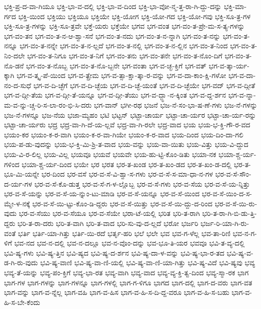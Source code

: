 {ಭಕ್ತಿ-ಪ್ರ-ದ-ವಾ-ಗಿಯೂ
ಭಕ್ತಿ-ಭಾ-ವ-ದಲ್ಲಿ
ಭಕ್ತಿ-ಭಾ-ವ-ದಿಂದ
ಭಕ್ತಿ-ಭಾ-ವೋ-ನ್ಮ-ತ್ತ-ರಾ-ಗಿ-ದ್ದು-ದನ್ನು
ಭಕ್ತಿ-ಮಾ-ರ್ಗದ
ಭಕ್ತಿ-ಯಿಂದ
ಭಕ್ತಿಯು
ಭಕ್ತಿಯೂ
ಭಕ್ತಿಯೇ
ಭಕ್ತಿ-ಯೋಗ
ಭಕ್ತಿ-ಯೋ-ಗದ
ಭಕ್ತಿ-ಯೋ-ಗವು
ಭಕ್ತಿ-ಸೂ-ತ್ರ-ಗಳ
ಭಕ್ತಿ-ಸೂ-ತ್ರ-ಗಳನ್ನು
ಭಕ್ತಿ-ಸೂ-ತ್ರವೇ
ಭಕ್ತೆ-ಯರು
ಭಕ್ತೆಯೇ
ಭಗವ
ಭಗ-ವಂತ
ಭಗ-ವಂ-ತ-ಪ್ರೇ-ಮ-ಸ-ತ್ಯ-ಗಳನ್ನು
ಭಗ-ವಂ-ತನ
ಭಗ-ವಂ-ತ-ನ-ಆ-ಶ್ವಾ-ಸನೆ
ಭಗ-ವಂ-ತ-ನದು
ಭಗ-ವಂ-ತ-ನ-ನ್ನಾಗಿ
ಭಗ-ವಂ-ತ-ನನ್ನು
ಭಗ-ವಂ-ತ-ನನ್ನೂ
ಭಗ-ವಂ-ತ-ನನ್ನೇ
ಭಗ-ವಂ-ತ-ನ-ಲ್ಲದೆ
ಭಗ-ವಂ-ತ-ನಲ್ಲಿ
ಭಗ-ವಂ-ತ-ನ-ಲ್ಲಿನ
ಭಗ-ವಂ-ತ-ನಿಂದ
ಭಗ-ವಂ-ತ-ನಿಂ-ದಲೇ
ಭಗ-ವಂ-ತ-ನಿಗೂ
ಭಗ-ವಂ-ತ-ನಿಗೆ
ಭಗ-ವಂ-ತನು
ಭಗ-ವಂ-ತನೇ
ಭಗ-ವಂ-ತ-ನೊಂ-ದಿಗೆ
ಭಗ-ವಂ-ತ-ನೊ-ಡನೆ
ಭಗ-ವಂ-ತ-ನೊಬ್ಬ
ಭಗ-ವಂ-ತ-ನೊ-ಬ್ಬನೇ
ಭಗ-ವಂತಾ
ಭಗ-ವ-ಚ್ಛ-ಕ್ತಿಗೆ
ಭಗ-ವತ್
ಭಗ-ವ-ತ್ಕಾ-ರ್ಯ-ಕ್ಕಾಗಿ
ಭಗ-ವ-ತ್ಕೃ-ಪೆ-ಯಿಂದ
ಭಗ-ವ-ತ್ಪ್ರೇಮ
ಭಗ-ವ-ತ್ಸಾ-ಕ್ಷಾ-ತ್ಕಾ-ರ-ವನ್ನು
ಭಗ-ವ-ದಾ-ಕಾಂ-ಕ್ಷಿ-ಗಳೋ
ಭಗ-ವ-ದಾ-ನಂ-ದ-ಸುಧೆ
ಭಗ-ವ-ದಿ-ಚ್ಛೆಗೆ
ಭಗ-ವ-ದಿ-ಚ್ಛೆಯ
ಭಗ-ವ-ದಿ-ಚ್ಛೆ-ಯಂತೆ
ಭಗ-ವ-ದಿ-ಚ್ಛೆಯೇ
ಭಗ-ವದ್
ಭಗ-ವ-ದ್ಗೀತೆ
ಭಗ-ವ-ದ್ಗೀ-ತೆಯ
ಭಗ-ವ-ದ್ಗೀ-ತೆ-ಯನ್ನೂ
ಭಗ-ವ-ದ್ಗೀ-ತೆಯು
ಭಗ-ವ-ದ್ಜ್ಞಾ-ನ-ಕ್ಕಿಂತ
ಭಗ-ವ-ದ್ದ-ರ್ಶನ
ಭಗ-ವ-ನ್ನಾ-ಮ-ವ-ನ್ನು-ಚ್ಚ-ರಿ-ಸ-ಲಾ-ರಂ-ಭಿ-ಸಿ-ದರು
ಭಗ-ವಾನ್
ಭಗೀ-ರಥ
ಭಜನೆ
ಭಜ-ನೆ-ಸಂ-ಭಾ-ಷ-ಣೆ-ಗಳು
ಭಜ-ನೆ-ಗಳನ್ನು
ಭಜ-ನೆ-ಗಳನ್ನೂ
ಭಜ-ನೆಯ
ಭಜಾ-ಮ್ಯಹಂ
ಭಟಿ
ಭಟ್ಟನ್
ಭಟ್ಟಾ-ಚಾರ್ಯ
ಭಟ್ಟಾ-ಚಾ-ರ್ಯರ
ಭಟ್ಟಾ-ಚಾ-ರ್ಯ-ರನ್ನು
ಭಟ್ಟಾ-ಚಾ-ರ್ಯರು
ಭದ್ರ
ಭದ್ರ-ವಾ-ಗಿ-ದೆ-ಯ-ಲ್ಲವೆ
ಭದ್ರ-ವಾ-ಗಿ-ರಲೇ
ಭದ್ರ-ವಾದ
ಭಯ
ಭಯ-ಭ-ಕ್ತಿ-ಗೌ-ರ-ವದ
ಭಯಂ-ಕರ
ಭಯಂ-ಕ-ರ-ವಾಗಿ
ಭಯಂ-ಕ-ರ-ವಾ-ಗಿಯೇ
ಭಯಂ-ಕ-ರ-ವಾದ
ಭಯ-ದಿಂದ
ಭಯ-ದಿಂ-ದಾ-ಗಲಿ
ಭಯ-ಪ-ಡು-ವುದನ್ನು
ಭಯ-ಭ-ಕ್ತಿ-ಮಿ-ಶ್ರಿ-ತ-ವಾದ
ಭಯ-ವನ್ನು
ಭಯ-ವಾ-ಯಿತು
ಭಯ-ವಿತ್ತು
ಭಯ-ವಿ-ದ್ದುದ
ಭಯ-ವಿ-ರ-ಲಿಲ್ಲ
ಭಯ-ವಿಲ್ಲ
ಭಯವೂ
ಭಯವೆ
ಭಯವೇ
ಭಯ-ಹು-ಟ್ಟಿ-ಕೊಂ-ಡಿತು
ಭಯಾ-ನಕ
ಭಯಾ-ಶ್ಚ-ರ್ಯ-ಗಳಿಂದ
ಭಯಾ-ಶ್ಚ-ರ್ಯ-ದಿಂದ
ಭಯೇ
ಭರ
ಭರತ
ಭರ-ತ-ಖಂಡ
ಭರ-ತ-ಖಂ-ಡದ
ಭರ-ತ-ಖಂ-ಡ-ದಲ್ಲಿ
ಭರ-ತ-ಭೂ-ಮಿ-ಯನ್ನೇ
ಭರ-ದಿಂದ
ಭರ-ವಸೆ
ಭರ-ವ-ಸೆ-ವಿ-ಶ್ವಾ-ಸ-ಗಳು
ಭರ-ವ-ಸೆ-ಸ-ಮಾ-ಧಾ-ನ-ಗಳ
ಭರ-ವ-ಸೆ-ಸೌಂ-ದ-ರ್ಯ-ಗಳ
ಭರ-ವ-ಸೆ-ಕೊ-ಡುತ್ತ
ಭರ-ವ-ಸೆ-ಗ-ಳ-ಲ್ಲೊಬ್ಬ
ಭರ-ವ-ಸೆ-ಗಳು
ಭರ-ವ-ಸೆಯ
ಭರ-ವ-ಸೆ-ಯ-ನ್ನಿತ್ತು
ಭರ-ವ-ಸೆ-ಯನ್ನು
ಭರ-ವ-ಸೆ-ಯ-ನ್ನುಂ-ಟು-ಮಾಡಿ
ಭರ-ವ-ಸೆ-ಯನ್ನೂ
ಭರ-ವ-ಸೆ-ಯಿಂದ
ಭರ-ವ-ಸೆ-ಯಿಂ-ದ-ಸ-ಮ್ಮೇ-ಳ-ನಕ್ಕೆ
ಭರ-ವ-ಸೆ-ಯಿ-ಟ್ಟು-ಕೊಂ-ಡಿ-ದ್ದರು
ಭರ-ವ-ಸೆ-ಯಿತ್ತು
ಭರ-ವ-ಸೆ-ಯಿ-ದ್ದು-ದ-ರಿಂದ
ಭರ-ವ-ಸೆ-ಯಿ-ರು-ವುದು
ಭರ-ವ-ಸೆಯು
ಭರ-ವ-ಸೆಯೂ
ಭರ-ವ-ಸೆಯೇ
ಭರಾ-ಟೆ-ಯಲ್ಲಿ
ಭರಿತ
ಭರಿ-ತ-ರಾಗಿ
ಭರಿ-ತ-ರಾ-ಗಿ-ಬಿ-ಡು-ತ್ತಿ-ದ್ದರು
ಭರಿ-ತ-ರಾ-ದರು
ಭರಿ-ತ-ವಾಗಿ
ಭರಿ-ತ-ವಾದ
ಭರಿ-ಸು-ವು-ದ-ಲ್ಲದೆ
ಭರೋ
ಭರ್ಜರಿ
ಭರ್ಜ-ರಿ-ಯಾ-ಗಿ-ರು-ವಂತೆ
ಭರ್ತಿ
ಭರ್ತಿ-ಯಾ-ಗಿತ್ತು
ಭರ್ತಿ-ಯಿ-ರದೆ
ಭರ್ತೃ-ಹರಿ
ಭಲೆ
ಭಲೇ
ಭವ
ಭವ-ಗ-ಳೆಲ್ಲ
ಭವ-ತಾ-ರಿಣಿ
ಭವ-ನ-ಗ-ಳಿಗೆ
ಭವ-ನದ
ಭವ-ನ-ದಲ್ಲಿ
ಭವ-ನ-ದಲ್ಲೂ
ಭವ-ನ-ವೊಂ-ದನ್ನು
ಭವ-ಭೂ-ತಿ-ಯರ
ಭವವೂ
ಭವಿ-ತ-ವ್ಯ-ದಲ್ಲಿ
ಭವಿ-ಷ್ಯ-ಗಳು
ಭವಿ-ಷ್ಯ-ತ್ತಿನ
ಭವಿ-ಷ್ಯದ
ಭವಿ-ಷ್ಯ-ದ-ರ್ಶನ
ಭವಿ-ಷ್ಯ-ದಾ-ಳ-ವನ್ನು
ಭವಿ-ಷ್ಯ-ಭಾ-ರ-ತದ
ಭವಿ-ಷ್ಯ-ವ-ಡ-ಗಿ-ರು-ವುದು
ಭವಿ-ಷ್ಯ-ವಾಣಿ
ಭವಿ-ಷ್ಯ-ವಾ-ಣಿ-ಯಲ್ಲಿ
ಭವಿ-ಷ್ಯ-ವಾ-ಣಿ-ಯಾ-ಗಿತ್ತು
ಭವಿ-ಷ್ಯ-ವಿದೆ
ಭವಿ-ಷ್ಯವು
ಭವ್ಯ
ಭವ್ಯ-ತೆ-ಯನ್ನು
ಭವ್ಯ-ಪಂ-ಕ್ತಿಗೆ
ಭವ್ಯ-ಭಾ-ರತ
ಭವ್ಯ-ವಾಗಿ
ಭವ್ಯ-ವಾದ
ಭವ್ಯ-ವ್ಯ-ಕ್ತಿ-ತ್ವ-ದಿಂದ
ಭವ್ಯ-ಸ್ಮಾ-ರಕ
ಭಾಗ
ಭಾಗ-ಗಳ
ಭಾಗ-ಗಳನ್ನು
ಭಾಗ-ಗಳನ್ನೂ
ಭಾಗ-ಗಳಲ್ಲಿ
ಭಾಗ-ಗ-ಳಿಗೂ
ಭಾಗದ
ಭಾಗ-ದಲ್ಲಿ
ಭಾಗ-ದ-ವರು
ಭಾಗ-ವತ
ಭಾಗ-ವನ್ನು
ಭಾಗ-ವ-ನ್ನೆಲ್ಲ
ಭಾಗ-ವಹಿ
ಭಾಗ-ವ-ಹಿಸ
ಭಾಗ-ವ-ಹಿ-ಸ-ದಿ-ದ್ದ-ವರೂ
ಭಾಗ-ವ-ಹಿ-ಸ-ಬಹು
ಭಾಗ-ವ-ಹಿ-ಸ-ಬೇ-ಕೆಂದು
}
